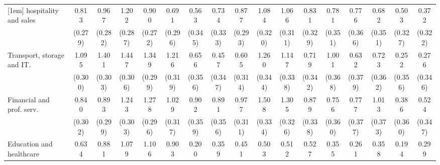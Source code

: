 {\begin{tabular}{l*{16}{c}}
[1em]
hospitality and sales&       0.813\sym{**} &       0.967\sym{***}&       1.202\sym{***}&       0.900\sym{***}&       0.691\sym{*}  &       0.563         &       0.734\sym{*}  &       0.877\sym{**} &       1.084\sym{***}&       1.066\sym{***}&       0.831\sym{*}  &       0.781\sym{*}  &       0.776\sym{*}  &       0.682         &       0.503         &       0.372         \\
                    &     (0.279)         &     (0.282)         &     (0.287)         &     (0.272)         &     (0.296)         &     (0.345)         &     (0.333)         &     (0.293)         &     (0.320)         &     (0.311)         &     (0.329)         &     (0.351)         &     (0.366)         &     (0.351)         &     (0.327)         &     (0.322)         \\
[1em]
Transport, storage and IT.&       1.095\sym{***}&       1.401\sym{***}&       1.447\sym{***}&       1.349\sym{***}&       1.216\sym{***}&       0.656         &       0.457         &       0.605         &       1.260\sym{***}&       1.147\sym{***}&       0.719\sym{*}  &       1.001\sym{**} &       0.632         &       0.723\sym{*}  &       0.252         &       0.276         \\
                    &     (0.300)         &     (0.303)         &     (0.306)         &     (0.299)         &     (0.319)         &     (0.356)         &     (0.347)         &     (0.314)         &     (0.344)         &     (0.338)         &     (0.342)         &     (0.368)         &     (0.379)         &     (0.362)         &     (0.356)         &     (0.346)         \\
[1em]
Financial and prof. serv.&       0.840\sym{**} &       0.893\sym{**} &       1.243\sym{***}&       1.278\sym{***}&       1.029\sym{**} &       0.902\sym{*}  &       0.891\sym{*}  &       0.977\sym{**} &       1.508\sym{***}&       1.305\sym{***}&       0.879\sym{**} &       0.756\sym{*}  &       0.777\sym{*}  &       1.013\sym{**} &       0.386         &       0.524         \\
                    &     (0.302)         &     (0.299)         &     (0.303)         &     (0.296)         &     (0.317)         &     (0.359)         &     (0.356)         &     (0.311)         &     (0.334)         &     (0.326)         &     (0.338)         &     (0.360)         &     (0.377)         &     (0.373)         &     (0.360)         &     (0.347)         \\
[1em]
Education and healthcare&       0.634         &       0.881\sym{**} &       1.079\sym{**} &       1.106\sym{**} &       0.903\sym{*}  &       0.200         &       0.359         &       0.451         &       0.503         &       0.512         &       0.527         &       0.355         &       0.261         &       0.358         &       0.194         &       0.299         \\

\end{tabular}}
